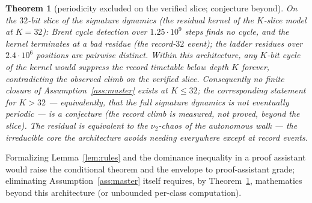 \documentclass[11pt]{amsart}
\newtheorem{theorem}{Theorem}[section]
\theoremstyle{definition}
\begin{document}
\begin{theorem}[periodicity excluded on the verified slice; conjecture beyond]\label{thm:noCycle}
On the $32$-bit slice of the signature dynamics (the residual kernel of
the $K$-slice model at $K=32$): Brent cycle detection over
$1.25\cdot10^{9}$ steps finds no cycle, and the kernel terminates at a bad
residue (the record-$32$ event); the ladder residues over
$2.4\cdot10^{6}$ positions are pairwise distinct. Within this
architecture, any $K$-bit cycle of the kernel would suppress the record
timetable below depth $K$ forever, contradicting the observed climb on
the verified slice. Consequently no finite closure of
Assumption~\ref{ass:master} exists at $K\le32$; the corresponding
statement for $K>32$ --- equivalently, that the full signature dynamics
is not eventually periodic --- is a \emph{conjecture} (the record climb
is measured, not proved, beyond the slice). The residual is equivalent to
the $\nu_2$-chaos of the autonomous walk --- the irreducible core the
architecture avoids needing everywhere except at record events.
\end{theorem}

Formalizing Lemma~\ref{lem:rules} and the dominance inequality in a proof
assistant would raise the conditional theorem and the envelope to
proof-assistant grade; eliminating Assumption~\ref{ass:master} itself
requires, by Theorem~\ref{thm:noCycle}, mathematics beyond this
architecture (or unbounded per-class computation).
\end{document}
